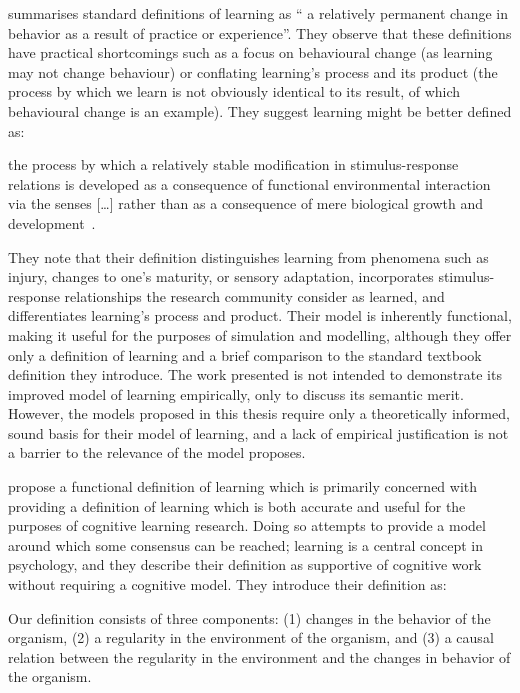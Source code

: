 \citet{lachman1997learning} summarises standard definitions of learning as
``\textelp{} a relatively permanent change in behavior as a result of practice
or experience''. They observe that these definitions have practical shortcomings
such as a focus on behavioural change (as learning may not change behaviour) or
conflating learning's process and its product (the process by which we learn is
not obviously identical to its result, of which behavioural change is an
example). They suggest learning might be better defined as:

\begin{displayquote}
\textelp{} the process by which a relatively stable modification in
stimulus-response relations is developed as a consequence of functional
environmental interaction via the senses [\ldots{}] rather than as a consequence
of mere biological growth and development~\cite{lachman1997learning}.
\end{displayquote}

They note that their definition distinguishes learning from phenomena such as
injury, changes to one's maturity, or sensory adaptation, incorporates
stimulus-response relationships the research community consider as learned, and
differentiates learning's process and product. Their model is inherently
functional, making it useful for the purposes of simulation and modelling,
although they offer only a definition of learning and a brief comparison to
the standard textbook definition they introduce. The work presented is not
intended to demonstrate its improved model of learning empirically, only to
discuss its semantic merit. However, the models proposed in this thesis require
only a theoretically informed, sound basis for their model of learning, and a
lack of empirical justification is not a barrier to the relevance of the model
\citeauthor{lachman1997learning} proposes.

\citet{de2013learning} propose a functional definition of learning which is
primarily concerned with providing a definition of learning which is both
accurate and useful for the purposes of cognitive learning research. Doing so
attempts to provide a model around which some consensus can be reached; learning
is a central concept in psychology, and they describe their definition as
supportive of cognitive work without requiring a cognitive model. They introduce
their definition as:

\begin{displayquote}
Our definition consists of three components: (1) changes in the behavior of the
organism, (2) a regularity in the environment of the organism, and (3) a causal
relation between the regularity in the environment and the changes in behavior
of the organism.
\end{displayquote}

